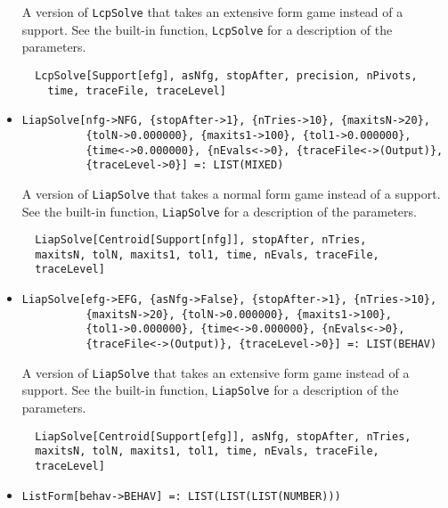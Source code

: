 \begin{itemize}
\bd 
A version of \verb+LcpSolve+ that takes an extensive form
game instead of a support.  See the built-in function,
\verb+LcpSolve+ for a description of the parameters.
\begin{verbatim}
  LcpSolve[Support[efg], asNfg, stopAfter, precision, nPivots,
    time, traceFile, traceLevel]
\end{verbatim} 
\ed

\item{}
\protect \large \begin{verbatim}
LiapSolve[nfg->NFG, {stopAfter->1}, {nTries->10}, {maxitsN->20}, 
          {tolN->0.000000}, {maxits1->100}, {tol1->0.000000}, 
          {time<->0.000000}, {nEvals<->0}, {traceFile<->(Output)}, 
          {traceLevel->0}] =: LIST(MIXED) 
\end{verbatim}\normalsize

\bd 
A version of \verb+LiapSolve+ that takes a normal form
game instead of a support.  See the built-in function,
\verb+LiapSolve+ for a description of the parameters.
\begin{verbatim}
  LiapSolve[Centroid[Support[nfg]], stopAfter, nTries,
  maxitsN, tolN, maxits1, tol1, time, nEvals, traceFile,
  traceLevel]
\end{verbatim} 
\ed

\item{}
\protect \large \begin{verbatim}
LiapSolve[efg->EFG, {asNfg->False}, {stopAfter->1}, {nTries->10}, 
          {maxitsN->20}, {tolN->0.000000}, {maxits1->100}, 
          {tol1->0.000000}, {time<->0.000000}, {nEvals<->0}, 
          {traceFile<->(Output)}, {traceLevel->0}] =: LIST(BEHAV) 
\end{verbatim}\normalsize

\bd 
A version of \verb+LiapSolve+ that takes an extensive form
game instead of a support.  See the built-in function,
\verb+LiapSolve+ for a description of the parameters.
\begin{verbatim}
  LiapSolve[Centroid[Support[efg]], asNfg, stopAfter, nTries,
  maxitsN, tolN, maxits1, tol1, time, nEvals, traceFile,
  traceLevel]
\end{verbatim} 
\ed

\item{}
\protect \large \begin{verbatim}
ListForm[behav->BEHAV] =: LIST(LIST(LIST(NUMBER))) 
\end{verbatim}\normalsize


\end{itemize}
